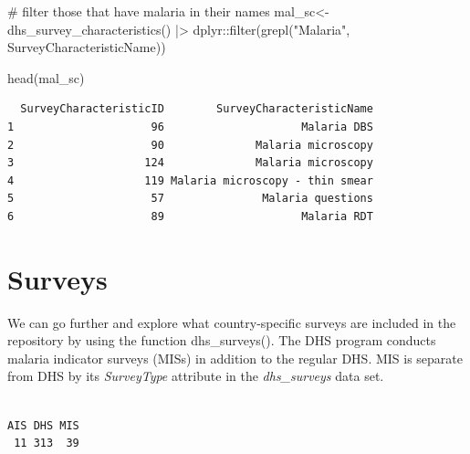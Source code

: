 \documentclass[
  letterpaper,
  DIV=11,
  numbers=noendperiod]{scrreprt}
\newenvironment{Shaded}{\begin{snugshade}}{\end{snugshade}}
\newcommand{\CommentTok}[1]{\textcolor[rgb]{0.37,0.37,0.37}{#1}}
\newcommand{\FunctionTok}[1]{\textcolor[rgb]{0.28,0.35,0.67}{#1}}
\newcommand{\NormalTok}[1]{\textcolor[rgb]{0.00,0.23,0.31}{#1}}
\newcommand{\OtherTok}[1]{\textcolor[rgb]{0.00,0.23,0.31}{#1}}
\newcommand{\SpecialCharTok}[1]{\textcolor[rgb]{0.37,0.37,0.37}{#1}}
\newcommand{\StringTok}[1]{\textcolor[rgb]{0.13,0.47,0.30}{#1}}
\begin{document}
\begin{Shaded}
\begin{Highlighting}[]
\CommentTok{\# filter those that have \textquotesingle{}malaria\textquotesingle{} in their names}
\NormalTok{mal\_sc}\OtherTok{\textless{}{-}}  \FunctionTok{dhs\_survey\_characteristics}\NormalTok{() }\SpecialCharTok{|\textgreater{}}
\NormalTok{  dplyr}\SpecialCharTok{::}\FunctionTok{filter}\NormalTok{(}\FunctionTok{grepl}\NormalTok{(}\StringTok{"Malaria"}\NormalTok{, SurveyCharacteristicName)) }

\FunctionTok{head}\NormalTok{(mal\_sc)}
\end{Highlighting}
\end{Shaded}

\begin{verbatim}
  SurveyCharacteristicID        SurveyCharacteristicName
1                     96                     Malaria DBS
2                     90              Malaria microscopy
3                    124              Malaria microscopy
4                    119 Malaria microscopy - thin smear
5                     57               Malaria questions
6                     89                     Malaria RDT
\end{verbatim}

\section{Surveys}\label{surveys}

We can go further and explore what country-specific surveys are included
in the repository by using the function dhs\_surveys(). The DHS program
conducts malaria indicator surveys (MISs) in addition to the regular
DHS. MIS is separate from DHS by its \emph{SurveyType} attribute in the
\emph{dhs\_surveys} data set.

\begin{Shaded}
\end{Shaded}

\begin{verbatim}

AIS DHS MIS 
 11 313  39 
\end{verbatim}
\end{document}
